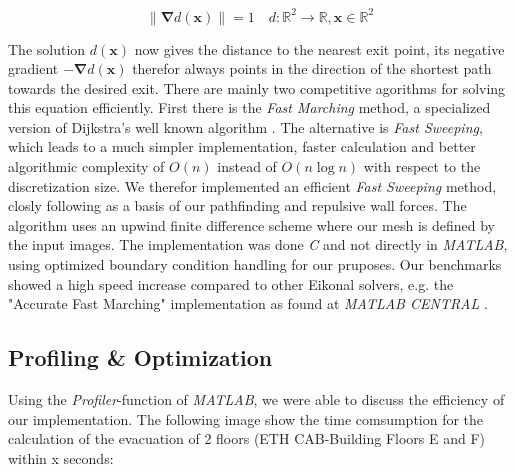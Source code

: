 \documentclass[11pt]{article}
\begin{document}
\begin{equation} \label{eq:eikonal}
\|\mathbf{\nabla} d(\mathbf{x})\|=1 \quad d:\!\mathbb{R}^{2}\to\mathbb{R},\mathbf{x}\in\mathbb{R}^{2}
\end{equation}

The solution $d(\mathbf{x})$ now gives the distance to the nearest exit point, its
negative gradient $-\mathbf{\nabla}d(\mathbf{x})$ therefor always points in the 
direction of the shortest path towards the desired exit. There are mainly two
competitive agorithms for solving this equation efficiently. First there is the
\textit{Fast Marching} method, a specialized version of Dijkstra's well known 
algorithm \cite{dijkstra59a}. The alternative is \textit{Fast Sweeping}, which 
leads to a much simpler implementation, faster calculation and better algorithmic
complexity of $O(n)$ instead of $O(n\log n)$ with respect to the discretization size.
We therefor implemented an efficient \textit{Fast Sweeping} method, closly following
\cite{Zhao04afast} as a basis of our pathfinding and repulsive wall forces. The 
algorithm uses an upwind finite difference scheme where our mesh is defined by 
the input images. The implementation was done \textit{C} and not directly in
\textit{MATLAB}, using optimized boundary condition handling for our pruposes.
Our benchmarks showed a high speed increase compared to other Eikonal solvers,
e.g. the "Accurate Fast Marching" implementation as found at \textit{MATLAB CENTRAL}
\cite{fastmarching}.



\subsection{Profiling \& Optimization}



Using the \textit{Profiler}-function of \textit{MATLAB}, we were able to discuss
the efficiency of our implementation. The following image show the time comsumption
for the calculation of the evacuation of 2 floors (ETH CAB-Building Floors E and F) within x seconds:
\end{document}
